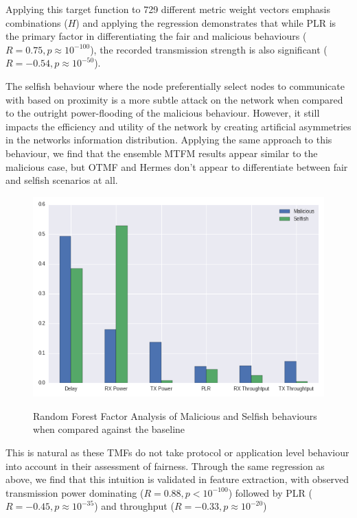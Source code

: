 \documentclass[conference]{IEEEtran}
\begin{document}
Applying this target function to 729 different metric weight vectors emphasis combinations ($H$) and applying the regression demonstrates that while PLR is the primary factor in differentiating the fair and malicious behaviours ($R=0.75, p\approx10^{-100}$), the recorded transmission strength is also significant ($R=-0.54, p\approx10^{-50}$).

The selfish behaviour where the node preferentially select nodes to communicate with based on proximity is a more subtle attack on the network when compared to the outright power-flooding of the malicious behaviour.
However, it still impacts the efficiency and utility of the network by creating artificial asymmetries in the networks information distribution.
Applying the same approach to this behaviour, we find that the ensemble MTFM results appear similar to the malicious case, but OTMF and Hermes don't appear to differentiate between fair and selfish scenarios at all.

\begin{figure}
  \centering
  \includegraphics[width=0.95\linewidth]{img/MaliciousSelfishMetricFactors}\label{fig:malselfactors}
  \caption{Random Forest Factor Analysis of Malicious and Selfish behaviours when compared against the baseline}
\end{figure}

This is natural as these TMFs do not take protocol or application level behaviour into account in their assessment of fairness.
Through the same regression as above, we find that this intuition is validated in feature extraction, with observed transmission power dominating ($R=0.88, p<10^{-100}$) followed by PLR ($R=-0.45, p\approx10^{-35}$) and throughput ($R=-0.33, p\approx10^{-20}$)
\end{document}

